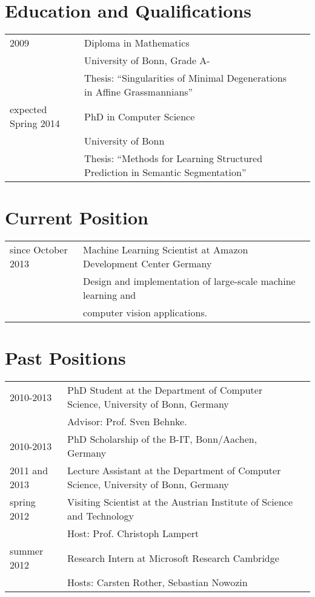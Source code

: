 \documentclass[a4paper,11pt]{article}
\begin{document}
\maketitle

\section{Education and Qualifications}
\begin{tabular}{lll}
    2009 & Diploma in Mathematics \\ & University of Bonn, Grade A-\\
         & Thesis: ``Singularities of Minimal Degenerations in Affine Grassmannians'' \\
    expected Spring 2014 & PhD in Computer Science \\ & University of Bonn \\
         & Thesis: ``Methods for Learning Structured Prediction in Semantic Segmentation''
\end{tabular}

\section{Current Position}
\begin{tabular}{lll}
    since October 2013 & Machine Learning Scientist at Amazon Development Center Germany\\
                       & Design and implementation of large-scale machine learning and\\
                       & computer vision applications.
\end{tabular}

\section{Past Positions}
\begin{tabular}{lll}
    2010-2013 & PhD Student at the Department of Computer Science, University of Bonn, Germany\\
         & Advisor: Prof. Sven Behnke. \\
    2010-2013 & PhD Scholarship of the B-IT, Bonn/Aachen, Germany\\
    2011 and 2013& Lecture Assistant at the Department of Computer Science, University of Bonn, Germany \\
    spring 2012 & Visiting Scientist at the Austrian Institute of Science and Technology\\
               & Host: Prof. Christoph Lampert\\
    summer 2012 & Research Intern at Microsoft Research Cambridge\\
               & Hosts: Carsten Rother, Sebastian Nowozin\\
\end{tabular}
\end{document}
